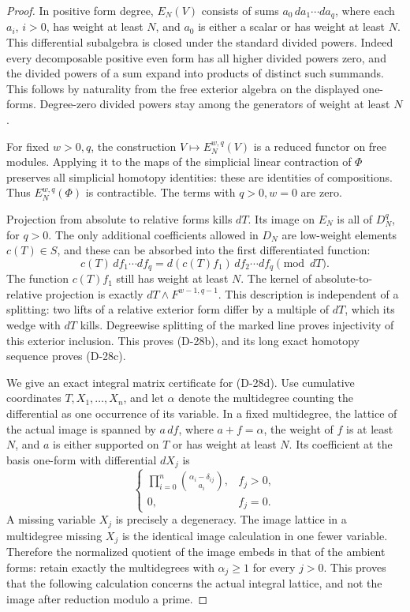 \begin{proof}
In positive form degree, \(E_N(V)\) consists of sums
\(a_0\,da_1\cdots da_q\), where each \(a_i\), \(i>0\),
has weight at least \(N\), and \(a_0\) is either a scalar
or has weight at least \(N\). This differential subalgebra
is closed under the standard divided powers. Indeed every
decomposable positive even form has all higher divided
powers zero, and the divided powers of a sum expand into
products of distinct such summands. This follows by
naturality from the free exterior algebra on the displayed
one-forms. Degree-zero divided powers stay among the
generators of weight at least \(N\).

For fixed \(w>0,q\), the construction \(V\mapsto E_N^{w,q}(V)\)
is a reduced functor on free modules. Applying it to the
maps of the simplicial linear contraction of \(\Phi\)
preserves all simplicial homotopy identities: these are
identities of compositions. Thus \(E_N^{w,q}(\Phi)\) is
contractible. The terms with \(q>0,w=0\) are zero.

Projection from absolute to relative forms kills \(dT\).
Its image on \(E_N\) is all of \(D_N^q\), for \(q>0\).
The only additional coefficients allowed in \(D_N\) are
low-weight elements \(c(T)\in S\), and these can be
absorbed into the first differentiated function:
\[
 c(T)\,df_1\cdots df_q
       =d(c(T)f_1)\,df_2\cdots df_q\pmod{dT}.
 \tag{D-28e}
\]
The function \(c(T)f_1\) still has weight at least \(N\).
The kernel of absolute-to-relative projection is exactly
\(dT\wedge F^{w-1,q-1}\). This description is independent
of a splitting: two lifts of a relative exterior form
differ by a multiple of \(dT\), which its wedge with
\(dT\) kills. Degreewise splitting of the marked line
proves injectivity of this exterior inclusion.
This proves (D-28b), and its long exact homotopy sequence
proves (D-28c).

We give an exact integral matrix certificate for (D-28d).
Use cumulative coordinates \(T,X_1,\ldots,X_n\), and let
\(\alpha\) denote the multidegree counting the differential
as one occurrence of its variable. In a fixed multidegree,
the lattice of the actual image is spanned by \(a\,df\),
where \(a+f=\alpha\), the weight of \(f\) is at least \(N\),
and \(a\) is either supported on \(T\) or has weight at
least \(N\). Its coefficient at the basis one-form with
differential \(dX_j\) is
\[
 \begin{cases}
 \displaystyle\prod_{i=0}^n
           \binom{\alpha_i-\delta_{ij}}{a_i},&f_j>0,\\
 0,&f_j=0.
 \end{cases}
 \tag{D-28f}
\]
A missing variable \(X_j\) is precisely a degeneracy.
The image lattice in a multidegree missing \(X_j\) is
the identical image calculation in one fewer variable.
Therefore the normalized quotient of the image embeds
in that of the ambient forms: retain exactly the
multidegrees with \(\alpha_j\ge1\) for every \(j>0\).
This proves that the following calculation concerns
the actual integral lattice, and not the image after
reduction modulo a prime.


\end{proof}
